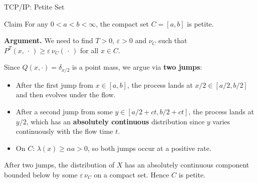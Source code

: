 \documentclass[aspectratio=169]{beamer}
\begin{document}
\begin{frame}{TCP/IP: Petite Set}

  \begin{block}{Claim}
    For any $0 < a < b < \infty$, the compact set $C = [a,b]$ is
    petite.
  \end{block}

  \textbf{Argument.} We need to find $T > 0$, $\varepsilon > 0$ and
  $\nu_C$ such that $P^T(x,\,\cdot\,) \geq \varepsilon\,\nu_C(\,\cdot\,)$
  for all $x \in C$.

  Since $Q(x,\cdot) = \delta_{x/2}$ is a point mass, we argue via
  \textbf{two jumps}:
  \begin{itemize}
    \setlength\itemsep{6pt}
    \item After the first jump from $x \in [a,b]$, the process lands
          at $x/2 \in [a/2, b/2]$ and then evolves under the flow.
    \item After a second jump from some $y \in [a/2+ct, b/2+ct]$,
          the process lands at $y/2$, which has an \textbf{absolutely
          continuous} distribution since $y$ varies continuously with
          the flow time $t$.
    \item On $C$: $\lambda(x) \geq \alpha a > 0$, so both jumps
          occur at a positive rate.
  \end{itemize}

  After two jumps, the distribution of $X$ has an absolutely
  continuous component bounded below by some $\varepsilon\,\nu_C$
  on a compact set. Hence $C$ is petite.

\end{frame}
\end{document}
